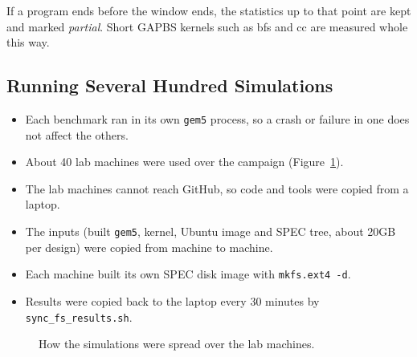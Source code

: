 If a program ends before the window ends, the statistics up to that point are kept and marked \emph{partial}. Short GAPBS kernels such as bfs and cc are measured whole this way.

\subsection{Running Several Hundred Simulations}
\begin{itemize}
    \item Each benchmark ran in its own \texttt{gem5} process, so a crash or failure in one does not affect the others.
    \item About 40 lab machines were used over the campaign (Figure~\ref{fig:infra}).
    \item The lab machines cannot reach GitHub, so code and tools were copied from a laptop.
    \item The inputs (built \texttt{gem5}, kernel, Ubuntu image and SPEC tree, about 20GB per design) were copied from machine to machine.
    \item Each machine built its own SPEC disk image with \texttt{mkfs.ext4 -d}.
    \item Results were copied back to the laptop every 30 minutes by \texttt{sync\_fs\_results.sh}.
\end{itemize}

\begin{figure}[H]
\centering
{}
\caption{How the simulations were spread over the lab machines.}
\label{fig:infra}
\end{figure}

